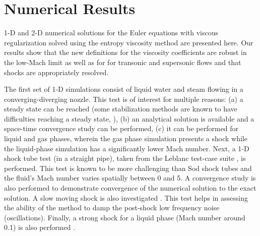 \documentclass[preprint,10pt]{elsarticle}
\begin{document}
\section{Numerical Results} \label{sec:results}

1-D and 2-D numerical solutions for the Euler equations with viscous regularization solved using the entropy 
viscosity method are presented here.
Our results show that the new definitions for the viscosity coefficients are robust in the low-Mach limit as well as for
for transonic and supersonic flows and that shocks are appropriately resolved. 

The first set of 1-D simulations consist of liquid water and steam flowing in a converging-diverging nozzle. 
This test is of interest for multiple reasons: (a) a steady state can be reached (some stabilization methods 
are known to have difficulties reaching a steady state, \cite{FluxLimiter, FluxLimiter2}), (b) 
an analytical solution is available and a space-time convergence study can be performed, (c) it 
can be performed for liquid and gas phases, wherein the gas phase simulation presents a shock while 
the liquid-phase simulation has a significantly lower Mach number.
%
Next, a 1-D shock tube test (in a straight pipe), taken from the Leblanc test-case suite \cite{Leblanc}, 
is performed. This test is known to be more challenging than Sod shock tubes and the fluid's Mach 
number varies spatially between 0 and 5. A convergence study is also performed to demonstrate 
convergence of the numerical solution to the exact solution. 
%
A slow moving shock is also investigated \cite{james}. This test helps in assessing the ability of 
the method to damp the post-shock low frequency noise (oscillations). 
%
Finally, a strong shock for a liquid phase (Mach number around 0.1) is also performed \cite{abgrall}.
\end{document}
